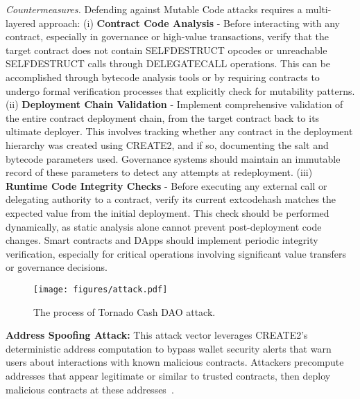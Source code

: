 \documentclass[acmsmall, screen]{acmart}
\begin{document}
	\textit{Countermeasures.} Defending against Mutable Code attacks requires a multi-layered
	approach: (i) \textbf{Contract Code Analysis} - Before interacting with any contract, especially
	in governance or high-value transactions, verify that the target contract does not contain
	SELFDESTRUCT opcodes or unreachable SELFDESTRUCT calls through DELEGATECALL operations. This can
	be accomplished through bytecode analysis tools or by requiring contracts to undergo formal verification
	processes that explicitly check for mutability patterns. (ii) \textbf{Deployment Chain
	Validation} - Implement comprehensive validation of the entire contract deployment chain, from
	the target contract back to its ultimate deployer. This involves tracking whether any contract in
	the deployment hierarchy was created using CREATE2, and if so, documenting the salt and bytecode
	parameters used. Governance systems should maintain an immutable record of these parameters to
	detect any attempts at redeployment. (iii) \textbf{Runtime Code Integrity Checks} - Before
	executing any external call or delegating authority to a contract, verify its current extcodehash
	matches the expected value from the initial deployment. This check should be performed
	dynamically, as static analysis alone cannot prevent post-deployment code changes. Smart
	contracts and DApps should implement periodic integrity verification, especially for critical operations
	involving significant value transfers or governance decisions.

	\begin{figure}[t]
		\centering
		\texttt{[image: figures/attack.pdf]}
		\caption{The process of Tornado Cash DAO attack.}
		\label{fig:tornado_attack}
	\end{figure}

	\textbf{Address Spoofing Attack:} This attack vector leverages CREATE2's deterministic address computation
	to bypass wallet security alerts that warn users about interactions with known malicious contracts.
	Attackers precompute addresses that appear legitimate or similar to trusted contracts, then deploy
	malicious contracts at these addresses~\cite{scamsniffer-create2-bypass,checkpoint-create2-security}.
\end{document}
